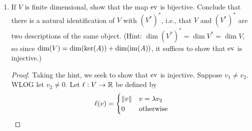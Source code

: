 \documentclass[../psets.tex]{subfiles}
\begin{document}
\begin{enumerate}[label={\textbf{1.2.\roman*.}}]
\begin{enumerate}
\begin{proof}
\begin{align*}
                &= \ell_1(v)+\ell_2(v)&
                    &= \lambda\ell(v)\\
                &= \eva_v(\ell_1)+\eva_v(\ell_2)&
                    &= \lambda\eva_v(\ell)
            \end{align*}
            so $\eva_v$ is linear, as desired.\par
            Let $v_1,v_2,v\in V$, $\ell\in V^*$, and $\lambda\in\R$ be arbitrary. Then
            \begin{align*}
                \eva(v_1+v_2)(\ell) &= \eva_{v_1+v_2}(\ell)&
                    \eva(\lambda v)(\ell) &= \eva_{\lambda v}(\ell)\\
                &= \ell(v_1+v_2)&
                    &= \ell(\lambda v)\\
                &= \ell(v_1)+\ell(v_2)&
                    &= \lambda\ell(v)\\
                &= \eva_{v_1}(\ell)+\eva_{v_2}(\ell)&
                    &= \lambda\eva_v(\ell)\\
                &= \eva(v_1)(\ell)+\eva(v_2)(\ell)&
                    &= \lambda\eva(v)(\ell)\\
                &= [\eva(v_1)+\eva(v_2)](\ell)&
                    &= [\lambda\eva(v)](\ell)
            \end{align*}
            Thus, $\eva(v_1+v_2)$ and $\eva(v_1)+\eva(v_2)$, and $\eva(\lambda v)$ and $\lambda\eva(v)$ have the same action pairwise on every $\ell\in V^*$. Consequently, the two pairs of functions in $V^*$ are both equal pairwise. Therefore, $\eva$ itself is linear.
        \end{proof}
        \item If $V$ is finite dimensional, show that the map $\eva$ is bijective. Conclude that there is a natural identification of $V$ with $(V^*)^*$, i.e., that $V$ and $(V^*)^*$ are two descriptions of the same object. (Hint: $\dim(V^*)^*=\dim V^*=\dim V$, so since $\dim(V)=\dim(\ker(A))+\dim(\operatorname{im}(A))$, it suffices to show that $\eva$ is injective.)
        \begin{proof}
            Taking the hint, we seek to show that $\eva$ is injective. Suppose $v_1\neq v_2$. WLOG let $v_2\neq 0$. Let $\ell:V\to\mathbb{R}$ be defined by
            \begin{equation*}
                \ell(v) =
                \begin{cases}
                    \norm{v} & v=\lambda v_2\\
                    0 & \text{otherwise}
                \end{cases}

\end{equation*}
\end{proof}
\end{enumerate}
\end{enumerate}
\end{document}
